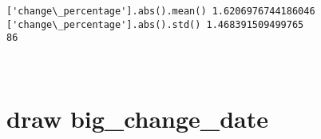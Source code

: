 \documentclass[11pt]{article}
\begin{document}
    \begin{Verbatim}[commandchars=\\\{\}]
['change\_percentage'].abs().mean() 1.6206976744186046
['change\_percentage'].abs().std() 1.468391509499765
86

    \end{Verbatim}

    \begin{center}
    \end{center}
    { \hspace*{\fill} \\}
    
    \hypertarget{draw-big_change_date}{%
\section{draw big\_change\_date}\label{draw-big_change_date}}
\end{document}
